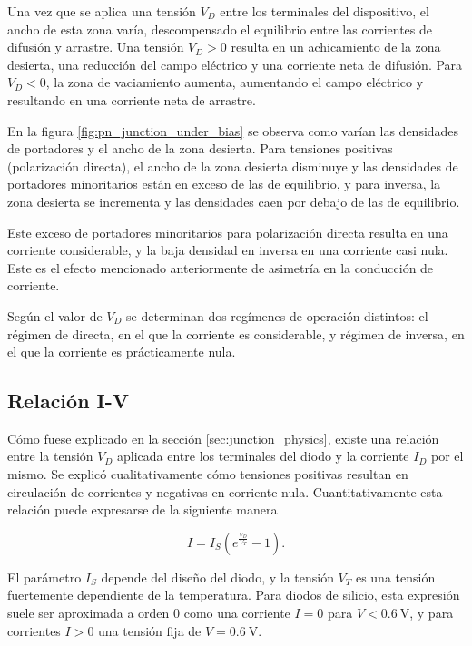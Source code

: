 Una vez que se aplica una tensión $V_D$ entre los terminales del dispositivo, el
ancho de esta zona varía, descompensado el equilibrio entre las corrientes de
difusión y arrastre. Una tensión $V_D > 0$ resulta en un achicamiento de la zona
desierta, una reducción del campo eléctrico y una corriente neta de difusión.
Para $V_D < 0$, la zona de vaciamiento aumenta, aumentando el campo eléctrico y
resultando en una corriente neta de arrastre.

En la figura \ref{fig:pn_junction_under_bias} se observa como varían las
densidades de portadores y el ancho de la zona desierta. Para tensiones
positivas (polarización directa), el ancho de la zona desierta disminuye y las
densidades de portadores minoritarios están en exceso de las de equilibrio, y
para inversa, la zona desierta se incrementa y las densidades caen por debajo de
las de equilibrio.

Este exceso de portadores minoritarios para polarización directa resulta en una
corriente considerable, y la baja densidad en inversa en una corriente casi
nula. Este es el efecto mencionado anteriormente de asimetría en la conducción
de corriente.

Según el valor de $V_D$ se determinan dos regímenes de operación distintos: el
régimen de directa, en el que la corriente es considerable, y régimen de
inversa, en el que la corriente es prácticamente nula.

\subsection{Relación I-V}

Cómo fuese explicado en la sección \ref{sec:junction_physics}, existe una
relación entre la tensión $V_D$ aplicada entre los terminales del diodo y la
corriente $I_D$ por el mismo. Se explicó cualitativamente cómo tensiones
positivas resultan en circulación de corrientes y negativas en corriente nula.
Cuantitativamente esta relación puede expresarse de la siguiente manera
\cite{neamen2012semiconductor}

\begin{equation}
    I = I_S \left( e^{\frac{V_D}{V_T}}-1\right).
\end{equation}

El parámetro $I_S$ depende del diseño del diodo, y la tensión $V_T$ es una
tensión fuertemente dependiente de la temperatura. Para diodos de silicio, esta
expresión suele ser aproximada a orden 0 como una corriente $I=0$ para $V<
\qty{0.6}{\volt}$, y para corrientes $I>0$ una tensión fija de $V =
\qty{0.6}{\volt}$.

